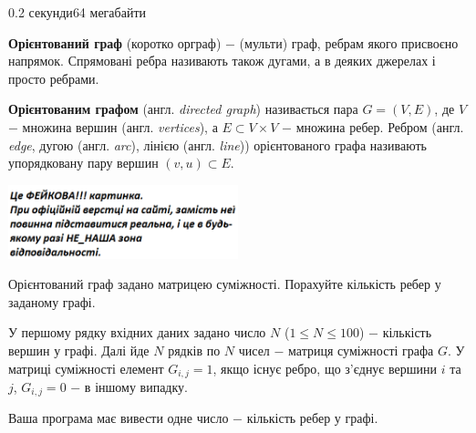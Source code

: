 \begin{problem}{}{}{}{0.2 секунди}{64 мегабайти}

{\bf {Орієнтований граф}} (коротко орграф) $-$ (мульти) граф, ребрам якого присвоєно напрямок. 
Спрямовані ребра називають також дугами, а в деяких джерелах і просто ребрами. 

{\bf {Орієнтованим графом}} (англ. {\emph{directed graph}}) називається пара $G=(V,E)$, де $V$ $-$ множина вершин 
(англ. {\emph{vertices}}), а $E \subset V \times V$ $-$ множина ребер. 
Ребром (англ. {\emph{edge}}, дугою (англ. {\emph{arc}}), лінією (англ. {\emph{line}})) орієнтованого графа 
називають упорядковану пару вершин $(v,u) \subset E$.

 \begin{center}
    \includegraphics[width=0.50\textwidth,natwidth=232,natheight=217]{pic.png}
  \end{center}


Орієнтований граф задано матрицею суміжності. Порахуйте кількість ребер у заданому графі.

\InputFile
У першому рядку вхідних даних задано число $N$ ($1 \le N \le 100$) $-$ кількість вершин у графі.
Далі йде $N$ рядків по $N$ чисел $-$ матриця суміжності графа $G$. У матриці суміжності елемент $G_{i,j}=1$, якщо
існує ребро, що з'єднує вершини $i$ та $j$, $G_{i,j}=0$ $-$ в іншому випадку.

\OutputFile
Ваша програма має вивести одне число $-$ кількість ребер у графі.

\Example

\begin{example}
%
\end{example}

\end{problem}

